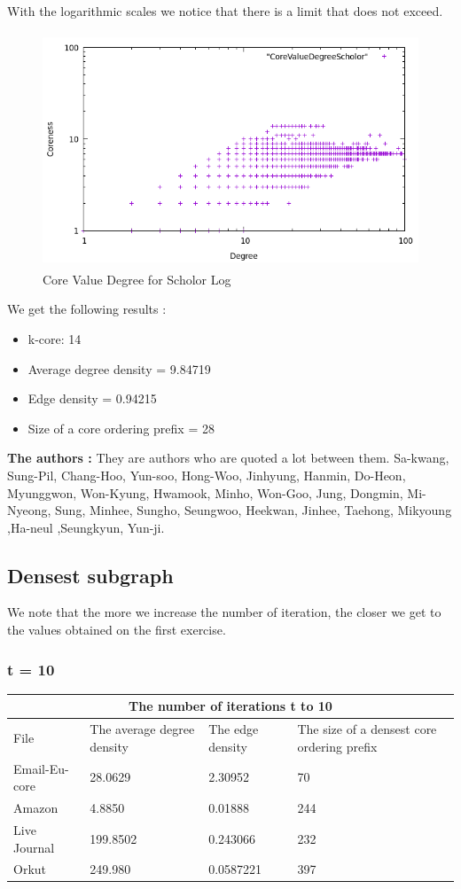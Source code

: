 \documentclass{article}
\begin{document}
With the logarithmic scales we notice that there is
a limit that does not exceed.
\begin{figure}[h!]
  \includegraphics[width=12cm, height=7cm]{CPlotlog.png}
  \caption{Core Value Degree for Scholor Log}
\end{figure}

We get the following results : 

\begin{itemize}
    \item k-core: 14
    \item Average degree density = 9.84719
    \item Edge density = 0.94215
    \item Size of a core ordering prefix = 28
\end{itemize}

\textbf{The authors :}
They are authors who are quoted a lot between them.
Sa-kwang, Sung-Pil, Chang-Hoo, Yun-soo, Hong-Woo, Jinhyung, Hanmin, Do-Heon, Myunggwon,
Won-Kyung, Hwamook, Minho, Won-Goo, Jung, Dongmin, Mi-Nyeong, Sung, Minhee, Sungho,
Seungwoo, Heekwan, Jinhee, Taehong, Mikyoung ,Ha-neul ,Seungkyun, Yun-ji.


\subsection{Densest subgraph}
We note that the more we increase the number of iteration, the closer we get to the values obtained on the first exercise.

\subsubsection{t = 10}
\begin{tabular}{ |p{3.0cm}||p{3.0cm}|p{3.0cm}|p{3.0cm}| }
 \hline
 \multicolumn{4}{|c|}{ The number of iterations t to 10 } \\
 \hline
 File & The average degree density & The edge density & The size of a densest core ordering prefix\\
 \hline
 Email-Eu-core & 28.0629 & 2.30952 & 70\\
 Amazon & 4.8850 & 0.01888 & 244 \\
 Live Journal & 199.8502 & 0.243066 & 232\\
 Orkut & 249.980 & 0.0587221 & 397\\
 \hline
\end{tabular}
\end{document}
